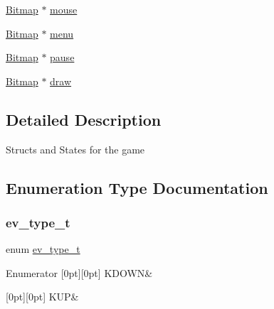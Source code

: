 \begin{DoxyCompactItemize}
\item 
\hyperlink{struct_bitmap}{Bitmap} $\ast$ \hyperlink{group___game_gad10f31a0fdb4d694a65599634f4b391a}{mouse}
\item 
\hyperlink{struct_bitmap}{Bitmap} $\ast$ \hyperlink{group___game_ga4b78da9fb4428d17e14ed11877396016}{menu}
\item 
\hyperlink{struct_bitmap}{Bitmap} $\ast$ \hyperlink{group___game_ga3b1e7565fd6de9b4795f4d1a2d00ec54}{pause}
\item 
\hyperlink{struct_bitmap}{Bitmap} $\ast$ \hyperlink{group___game_gae4e44e3db4f37bac0f34111b5cd471d1}{draw}
\end{DoxyCompactItemize}


\subsection{Detailed Description}
Structs and States for the game 

\subsection{Enumeration Type Documentation}
\hypertarget{group___game_gaabca14b349ba212174a00ffc1d2a2f31}{}\label{group___game_gaabca14b349ba212174a00ffc1d2a2f31} 
\subsubsection{\texorpdfstring{ev\+\_\+type\+\_\+t}{ev\_type\_t}}
{\footnotesize\ttfamily enum \hyperlink{group___game_gaabca14b349ba212174a00ffc1d2a2f31}{ev\+\_\+type\+\_\+t}}

\begin{DoxyEnumFields}{Enumerator}
[0pt][0pt]{}\hypertarget{group___game_ggaabca14b349ba212174a00ffc1d2a2f31a1a1b5730082d8a99750ec1442ef473b3}{}\label{group___game_ggaabca14b349ba212174a00ffc1d2a2f31a1a1b5730082d8a99750ec1442ef473b3} 
K\+D\+O\+WN&\\
\hline

[0pt][0pt]{}\hypertarget{group___game_ggaabca14b349ba212174a00ffc1d2a2f31a7811143a3a1f6274d18050dd91a6586e}{}\label{group___game_ggaabca14b349ba212174a00ffc1d2a2f31a7811143a3a1f6274d18050dd91a6586e} 
K\+UP&\\
\hline

\end{DoxyEnumFields}
\hypertarget{group___game_ga4edce1ca040716922b6e4a79be4e414d}{}\label{group___game_ga4edce1ca040716922b6e4a79be4e414d} 
